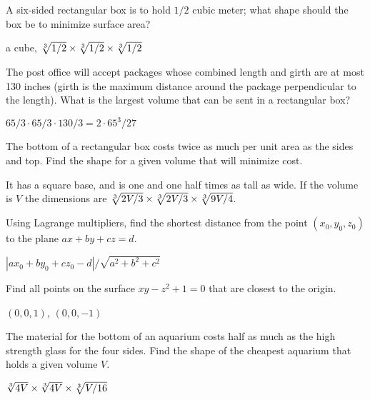 \begin{enumialphparenastyle}

\begin{ex}
A six-sided rectangular box is to hold $1/2$ cubic meter;
what shape should the box be to minimize surface area?
\begin{sol}
a cube, $\root 3 \of {1/2}\times\root 3 \of {1/2}\times\root 3 \of {1/2}$
\end{sol}
\end{ex}

\begin{ex}
The post office will accept packages whose combined length
and girth are at most 130 inches (girth is the maximum distance around
the package perpendicular to the length). What is the largest volume
that can be sent in a rectangular box?
\begin{sol}
$65/3\cdot 65/3\cdot 130/3=2\cdot 65^3/27$
\end{sol}
\end{ex}

\begin{ex}
The bottom of a rectangular box costs twice as much per unit
area as the sides and top. Find the shape for a given volume that will
minimize cost.
\begin{sol}
It has a square base, and is one and one half times as tall as wide.
If the volume is $V$ the dimensions are $\root 3 \of {2V/3}\times
\root 3 \of {2V/3}\times \root 3\of {9V/4}$.
\end{sol}
\end{ex}

\begin{ex}
Using Lagrange multipliers, find the shortest
distance from the point $(x_0,y_0,z_0)$ to the plane $ax+by+cz=d$.
\begin{sol}
$|ax_0+by_0+cz_0-d|/\sqrt{a^2+b^2+c^2}$
\end{sol}
\end{ex}

\begin{ex}
Find all points on the surface $xy-z^2+1=0$ that are closest
to the origin.
\begin{sol}
$(0,0,1)$, $(0,0,-1)$
\end{sol}
\end{ex}

\begin{ex}
The material for the bottom of an aquarium costs half as
much as the high strength glass for the four sides. Find the shape of
the cheapest aquarium that holds a given volume $V$.
\begin{sol}
$\root 3\of{4V}\times\root 3\of{4V}\times\root 3\of{V/16}$
\end{sol}
\end{ex}


\end{enumialphparenastyle}
